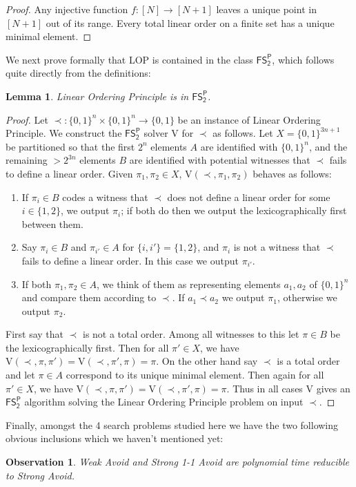\documentclass[11pt]{article}
\newtheorem{lemma}{Lemma}
\newtheorem{observation}{Observation}
\newcommand{\B}{\{0,1\}}
\begin{document}
\begin{proof}
Any injective function $f: [N] \to [N+1]$ leaves a unique point in $[N+1]$ out of its range. Every total linear order on a finite set has a unique minimal element.
\end{proof}
We next prove formally that LOP is contained in the class $\mathsf{FS_2^P}$, which follows quite directly from the definitions:
\begin{lemma}\label{lem:lop-in-s2p}
Linear Ordering Principle is in $\mathsf{FS_2^P}$.
\end{lemma}
\begin{proof}
Let $\prec: \B^n \times \B^n \to \B$ be an instance of Linear Ordering Principle. We construct the $\mathsf{FS_2^P}$ solver $\mathrm{V}$ for $\prec$ as follows. Let $X = \B^{3n+1}$ be partitioned so that the first $2^n$ elements $A$ are identified with $\B^n$, and the remaining $>2^{3n}$ elements $B$ are identified with potential witnesses that $\prec$ fails to define a linear order. Given $\pi_1,\pi_2 \in X$, $\mathrm{V}(\prec, \pi_1,\pi_2)$ behaves as follows:
\begin{enumerate}
    \item If $\pi_i \in B$ codes a witness that $\prec$ does not define a linear order for some $i \in \{1,2\}$, we output $\pi_i$; if both do then we output the lexicographically first between them.
    \item Say $\pi_i \in B$ and $\pi_{i'} \in A$ for $\{i,i'\}=\{1,2\}$, and $\pi_i$ is not a witness that $\prec$ fails to define a linear order. In this case we output $\pi_{i'}$.
    \item If both $\pi_1,\pi_2 \in A$, we think of them as representing elements $a_1,a_2$ of $\B^n$ and compare them according to $\prec$. If $a_1 \prec a_2$ we output $\pi_1$, otherwise we output $\pi_2$.
\end{enumerate}
First say that $\prec$ is not a total order. Among all witnesses to this let $\pi \in B$ be the lexicographically first. Then for all $\pi' \in X$, we have $\mathrm{V}(\prec,\pi,\pi')=\mathrm{V}(\prec,\pi',\pi)=\pi$. On the other hand say $\prec$ is a total order and let $\pi \in A$ correspond to its unique minimal element. Then again for all $\pi' \in X$, we have $\mathrm{V}(\prec,\pi,\pi')=\mathrm{V}(\prec,\pi',\pi)=\pi$. Thus in all cases $\mathrm{V}$ gives an $\mathsf{FS_2^P}$ algorithm solving the Linear Ordering Principle problem on input $\prec$.
\end{proof}
Finally, amongst the 4 search problems studied here we have the two following obvious inclusions which we haven't mentioned yet:
\begin{observation}
Weak Avoid and Strong 1-1 Avoid are polynomial time reducible to Strong Avoid.
\end{observation}
\end{document}
